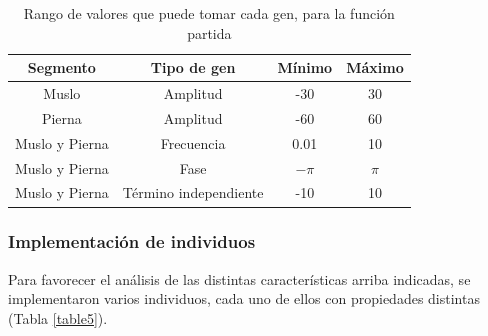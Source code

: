 \documentclass{article}
\begin{document}
\begin{table}[H]%
  \centering
  	\begin{tabular}{ | c | c || c | c | }
	  		\hline
	  		\textbf{Segmento} & \textbf{Tipo de gen} & \textbf{M\'inimo} & \textbf{M\'aximo} \\
			\hline
			Muslo & Amplitud & -30 & 30\\
			\hline
			Pierna & Amplitud & -60 & 60\\ 
			\hline
	  		Muslo y Pierna & Frecuencia & 0.01 & 10 \\ 
	  		\hline
			Muslo y Pierna & Fase & $-\pi$ & $\pi$ \\ 
			\hline
			Muslo y Pierna & T\'ermino independiente & -10 & 10 \\ 
			\hline
	\end{tabular}
  \captionsetup{justification=centering}
  \caption{Rango de valores que puede tomar cada gen, para la funci\'on partida}%
  \label{table4}%
\end{table}
\vspace{1pt}

\subsubsection{Implementaci\'on de individuos}
\label{individuos_implementacion}
Para favorecer el an\'alisis de las distintas caracter\'isticas arriba indicadas, se implementaron varios individuos, cada uno de ellos con propiedades distintas (Tabla \ref{table5}). \\
\end{document}
